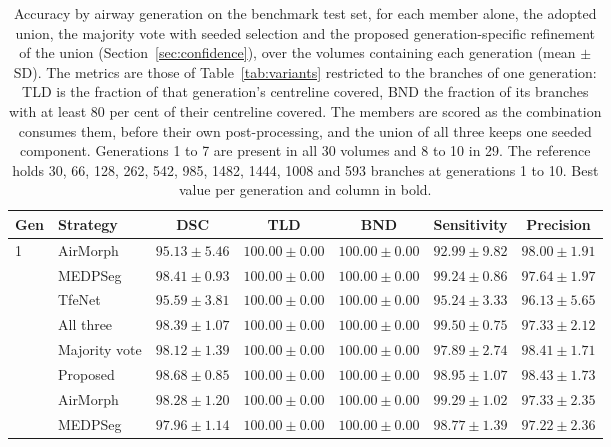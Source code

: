 \documentclass[runningheads]{llncs}
\begin{document}
\begin{table}[tbp]
\centering
\caption{Accuracy by airway generation on the benchmark test set, for each
member alone, the adopted union, the majority vote with seeded selection and
the proposed generation-specific refinement of the union
(Section~\ref{sec:confidence}), over the volumes containing each generation
(mean $\pm$ SD). The metrics are those of Table~\ref{tab:variants}
restricted to the branches of one generation: TLD is the fraction of that
generation's centreline covered, BND the fraction of its branches with at
least 80 per cent of their centreline covered. The members are scored as the
combination consumes them, before their own post-processing, and the union of
all three keeps one seeded component. Generations 1 to 7 are present in all
30 volumes and 8 to 10 in 29. The reference holds 30, 66, 128, 262, 542, 985,
1482, 1444, 1008 and 593 branches at generations 1 to 10. Best value per
generation and column in bold.}
\label{tab:gen}
\setlength{\tabcolsep}{1.3pt}\scriptsize
\begin{tabular}{@{}llccccc@{}}
\toprule
Gen & Strategy & DSC & TLD & BND & Sensitivity & Precision \\
\midrule
1 & AirMorph & $95.13 \pm 5.46$ & $\mathbf{100.00} \pm 0.00$ & $\mathbf{100.00} \pm 0.00$ & $92.99 \pm 9.82$ & $98.00 \pm 1.91$ \\
 & MEDPSeg & $98.41 \pm 0.93$ & $\mathbf{100.00} \pm 0.00$ & $\mathbf{100.00} \pm 0.00$ & $99.24 \pm 0.86$ & $97.64 \pm 1.97$ \\
 & TfeNet & $95.59 \pm 3.81$ & $\mathbf{100.00} \pm 0.00$ & $\mathbf{100.00} \pm 0.00$ & $95.24 \pm 3.33$ & $96.13 \pm 5.65$ \\
 & All three & $98.39 \pm 1.07$ & $\mathbf{100.00} \pm 0.00$ & $\mathbf{100.00} \pm 0.00$ & $\mathbf{99.50} \pm 0.75$ & $97.33 \pm 2.12$ \\
 & Majority vote & $98.12 \pm 1.39$ & $\mathbf{100.00} \pm 0.00$ & $\mathbf{100.00} \pm 0.00$ & $97.89 \pm 2.74$ & $98.41 \pm 1.71$ \\
 & Proposed & $\mathbf{98.68} \pm 0.85$ & $\mathbf{100.00} \pm 0.00$ & $\mathbf{100.00} \pm 0.00$ & $98.95 \pm 1.07$ & $\mathbf{98.43} \pm 1.73$ \\
\addlinespace[2pt]
2 & AirMorph & $98.28 \pm 1.20$ & $\mathbf{100.00} \pm 0.00$ & $\mathbf{100.00} \pm 0.00$ & $99.29 \pm 1.02$ & $97.33 \pm 2.35$ \\
 & MEDPSeg & $97.96 \pm 1.14$ & $\mathbf{100.00} \pm 0.00$ & $\mathbf{100.00} \pm 0.00$ & $98.77 \pm 1.39$ & $97.22 \pm 2.36$ \\

\end{tabular}
\end{table}
\end{document}
